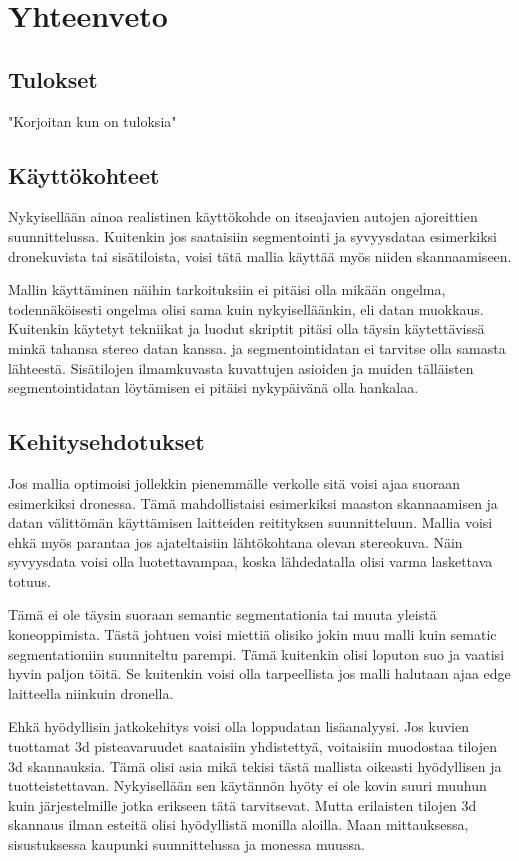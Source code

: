 \chapter{Yhteenveto}%
\label{ch:yhteenveto}

\section{Tulokset}

"Korjoitan kun on tuloksia"

\section{Käyttökohteet}

Nykyisellään ainoa realistinen käyttökohde on itseajavien autojen ajoreittien suunnittelussa. Kuitenkin jos saataisiin segmentointi ja syvyysdataa esimerkiksi dronekuvista tai sisätiloista, voisi tätä mallia käyttää myös niiden skannaamiseen.

Mallin käyttäminen näihin tarkoituksiin ei pitäisi olla mikään ongelma, todennäköisesti ongelma olisi sama kuin nykyiselläänkin, eli datan muokkaus. Kuitenkin käytetyt tekniikat ja luodut skriptit pitäsi olla täysin käytettävissä minkä tahansa stereo datan kanssa. ja segmentointidatan ei tarvitse olla samasta lähteestä. Sisätilojen ilmamkuvasta kuvattujen asioiden ja muiden tälläisten segmentointidatan löytämisen ei pitäisi nykypäivänä olla hankalaa.

\section{Kehitysehdotukset}

Jos mallia optimoisi jollekkin pienemmälle verkolle sitä voisi ajaa suoraan esimerkiksi dronessa. Tämä mahdollistaisi esimerkiksi maaston skannaamisen ja datan välittömän käyttämisen laitteiden reitityksen suunnitteluun. Mallia voisi ehkä myös parantaa jos ajateltaisiin lähtökohtana olevan stereokuva. Näin syvyysdata voisi olla luotettavampaa, koska lähdedatalla olisi varma laskettava totuus. 

Tämä ei ole täysin suoraan semantic segmentationia tai muuta yleistä koneoppimista. Tästä johtuen voisi miettiä olisiko jokin muu malli kuin sematic segmentationiin suunniteltu parempi. Tämä kuitenkin olisi loputon suo ja vaatisi hyvin paljon töitä. Se kuitenkin voisi olla tarpeellista jos malli halutaan ajaa edge laitteella niinkuin dronella. 

Ehkä hyödyllisin jatkokehitys voisi olla loppudatan lisäanalyysi. Jos kuvien tuottamat 3d pisteavaruudet saataisiin yhdistettyä, voitaisiin muodostaa tilojen 3d skannauksia. Tämä olisi asia mikä tekisi tästä mallista oikeasti hyödyllisen ja tuotteistettavan. Nykyisellään sen käytännön hyöty ei ole kovin suuri muuhun kuin järjestelmille jotka erikseen tätä tarvitsevat. Mutta erilaisten tilojen 3d skannaus ilman esteitä olisi hyödyllistä monilla aloilla. Maan mittauksessa, sisustuksessa kaupunki suunnittelussa ja monessa muussa.


